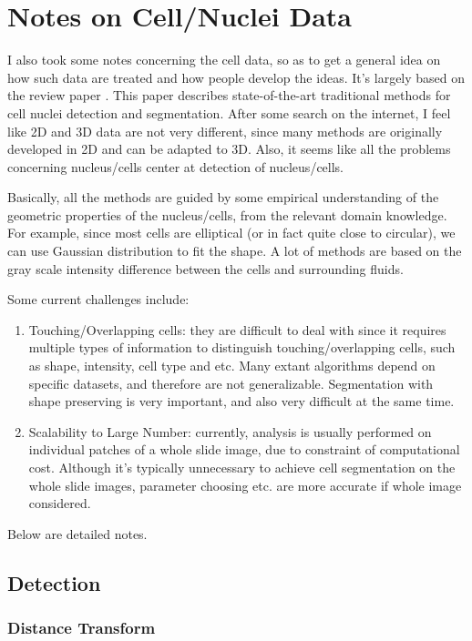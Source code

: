 \documentclass[10pt,a4paper]{article}
\begin{document}
\section{Notes on Cell/Nuclei Data}
I also took some notes concerning the cell data, so as to get a general idea on how such data are treated and how people develop the ideas. It's largely based on the review paper \cite{Xing2016}. This paper describes state-of-the-art traditional methods for cell nuclei detection and segmentation. After some search on the internet, I feel like 2D and 3D data are not very different, since many methods are originally developed in 2D and can be adapted to 3D. Also, it seems like all the problems concerning nucleus/cells center at detection of nucleus/cells.\par
Basically, all the methods are guided by some empirical understanding of the geometric properties of the nucleus/cells, from the relevant domain knowledge. For example, since most cells are elliptical (or in fact quite close to circular), we can use Gaussian distribution to fit the shape. A lot of methods are based on the gray scale intensity difference between the cells and surrounding fluids.\par
Some current challenges include:
\begin{enumerate}
	\item Touching/Overlapping cells: they are difficult to deal with since it requires multiple types of information to distinguish touching/overlapping cells, such as shape, intensity, cell type and etc. Many extant algorithms depend on specific datasets, and therefore are not generalizable. Segmentation with shape preserving is very important, and also very difficult at the same time.
	\item Scalability to Large Number: currently, analysis is usually performed on individual patches of a whole slide image, due to constraint of computational cost. Although it's typically unnecessary to achieve cell segmentation on the whole slide images, parameter choosing etc. are more accurate if whole image considered.
\end{enumerate}
Below are detailed notes.

\subsection{Detection}
\subsubsection{Distance Transform}
\end{document}
